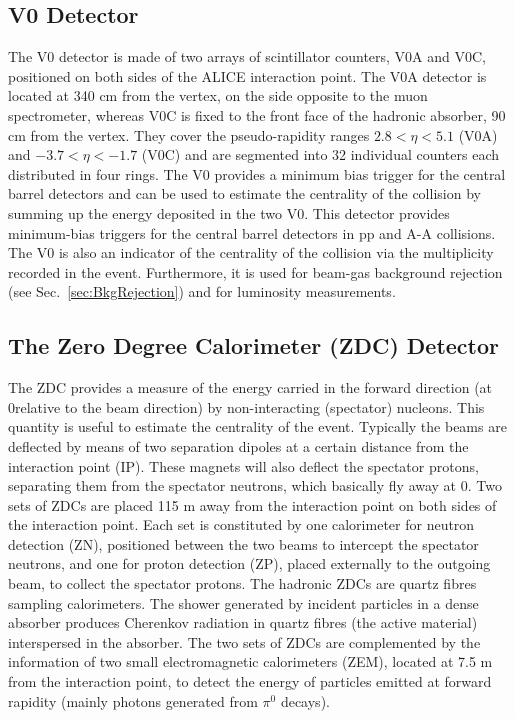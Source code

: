 \subsection{V0 Detector} 
\label{sec:V0}
The V0 detector is made of two arrays of scintillator counters, V0A and V0C, positioned on both sides of 
the ALICE interaction point. The V0A detector is located at 340 cm from the vertex, on the side opposite to the muon spectrometer,
whereas V0C is fixed to the front face of the hadronic absorber, 90 cm from the vertex. They cover
the pseudo-rapidity ranges $2.8 < \eta < 5.1$ (V0A) and $-3.7 < \eta < -1.7$ (V0C) and are segmented
into 32 individual counters each distributed in four rings. The V0 provides a minimum bias trigger for the central barrel detectors and
  can be used to estimate the centrality of the collision by summing up the energy deposited in the two V0.
This detector provides minimum-bias triggers for the central barrel
detectors in pp and A-A collisions. The V0 is also an indicator of the centrality of the collision via the multiplicity
recorded in the event. Furthermore, it is used for beam-gas background rejection (see Sec.~\ref{sec:BkgRejection}) 
and for luminosity measurements. 


\subsection{The Zero Degree Calorimeter (ZDC) Detector} 
\label{sec:ZDC}
The ZDC provides a measure of the energy carried in the forward direction (at 0\degree relative
to the beam direction) by non-interacting (spectator) nucleons. This quantity is
useful to estimate the centrality of the event. Typically the beams are deflected by means 
of two separation dipoles at a certain distance from the interaction point (IP). These magnets will also deflect the spectator
 protons, separating them from the spectator neutrons, which basically fly away at 0. 
Two sets of ZDCs are placed 115 m away from the 
 interaction point on both sides of the interaction point. Each set is constituted by one 
 calorimeter for neutron detection (ZN), positioned between the two 
 beams to intercept the spectator neutrons, and one for proton detection (ZP), placed externally 
 to the outgoing beam, to collect the spectator protons. 
  The hadronic ZDCs are quartz fibres sampling calorimeters. The shower generated by incident
particles in a dense absorber produces Cherenkov radiation in quartz fibres (the active material) interspersed in the absorber.
The two sets of ZDCs are complemented by the information of two small 
electromagnetic calorimeters (ZEM), located at 7.5 m from the interaction
 point, to detect the  energy of particles emitted at forward rapidity (mainly photons generated from $\pi^0$ decays).




